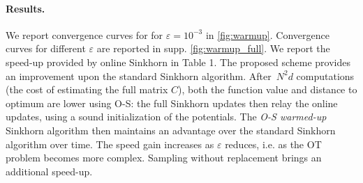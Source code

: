 \paragraph{Results.} We report convergence curves for for $\varepsilon =
10^{-3}$ in \autoref{fig:warmup}. Convergence curves for different
$\varepsilon$ are reported in supp. \autoref{fig:warmup_full}. We report the speed-up
provided by online Sinkhorn in Table 1. The proposed scheme provides an
improvement upon the standard Sinkhorn algorithm. After $N^2 d$ computations
(the cost of estimating the full matrix $C$), both the function value and
distance to optimum are lower using O-S: the full Sinkhorn updates then
relay the online updates, using a sound initialization of the potentials. The
\textit{O-S warmed-up} Sinkhorn algorithm then maintains an advantage over the
standard Sinkhorn algorithm over time. The speed gain increases
as $\varepsilon$ reduces, i.e. as the OT problem becomes more complex. Sampling without replacement brings an additional speed-up.
